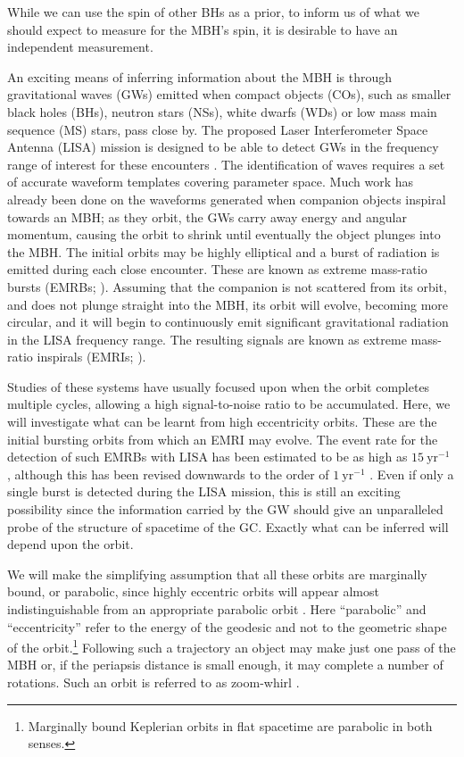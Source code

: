 \documentclass[useAMS,usedcolumn,usegraphicx,usenatbib]{mn2e}
\newcommand{\units}[1]{\ensuremath{~\mathrm{#1}}}
\begin{document}
While we can use the spin of other BHs as a prior, to inform us of what we should expect to measure for the MBH's spin, it is desirable to have an independent measurement.

An exciting means of inferring information about the MBH is through gravitational waves (GWs) emitted when compact objects (COs), such as smaller black holes (BHs), neutron stars (NSs), white dwarfs (WDs) or low mass main sequence (MS) stars, pass close by. The proposed Laser Interferometer Space Antenna (LISA) mission is designed to be able to detect GWs in the frequency range of interest for these encounters \citep{Bender1998, Danzmann2003}. The identification of waves requires a set of accurate waveform templates covering parameter space. Much work has already been done on the waveforms generated when companion objects inspiral towards an MBH; as they orbit, the GWs carry away energy and angular momentum, causing the orbit to shrink until eventually the object plunges into the MBH. The initial orbits may be highly elliptical and a burst of radiation is emitted during each close encounter. These are known as extreme mass-ratio bursts (EMRBs; \citealt{Rubbo2006}). Assuming that the companion is not scattered from its orbit, and does not plunge straight into the MBH, its orbit will evolve, becoming more circular, and it will begin to continuously emit significant gravitational radiation in the LISA frequency range. The resulting signals are known as extreme mass-ratio inspirals (EMRIs; \citealt{Amaro-Seoane2007}).

Studies of these systems have usually focused upon when the orbit completes multiple cycles, allowing a high signal-to-noise ratio to be accumulated. Here, we will investigate what can be learnt from high eccentricity orbits. These are the initial bursting orbits from which an EMRI may evolve. The event rate for the detection of such EMRBs with LISA has been estimated to be as high as $15\units{yr^{-1}}$ \citep{Rubbo2006}, although this has been revised downwards to the order of $1\units{yr^{-1}}$ \citep{Hopman2007}. Even if only a single burst is detected during the LISA mission, this is still an exciting possibility since the information carried by the GW should give an unparalleled probe of the structure of spacetime of the GC. Exactly what can be inferred will depend upon the orbit.

We will make the simplifying assumption that all these orbits are marginally bound, or parabolic, since highly eccentric orbits will appear almost indistinguishable from an appropriate parabolic orbit \citep{Kobayashi2004}. Here ``parabolic'' and ``eccentricity'' refer to the energy of the geodesic and not to the geometric shape of the orbit.\footnote{Marginally bound Keplerian orbits in flat spacetime are parabolic in both senses.} Following such a trajectory an object may make just one pass of the MBH or, if the periapsis distance is small enough, it may complete a number of rotations. Such an orbit is referred to as zoom-whirl \citep{Glampedakis2002a}.
\end{document}
